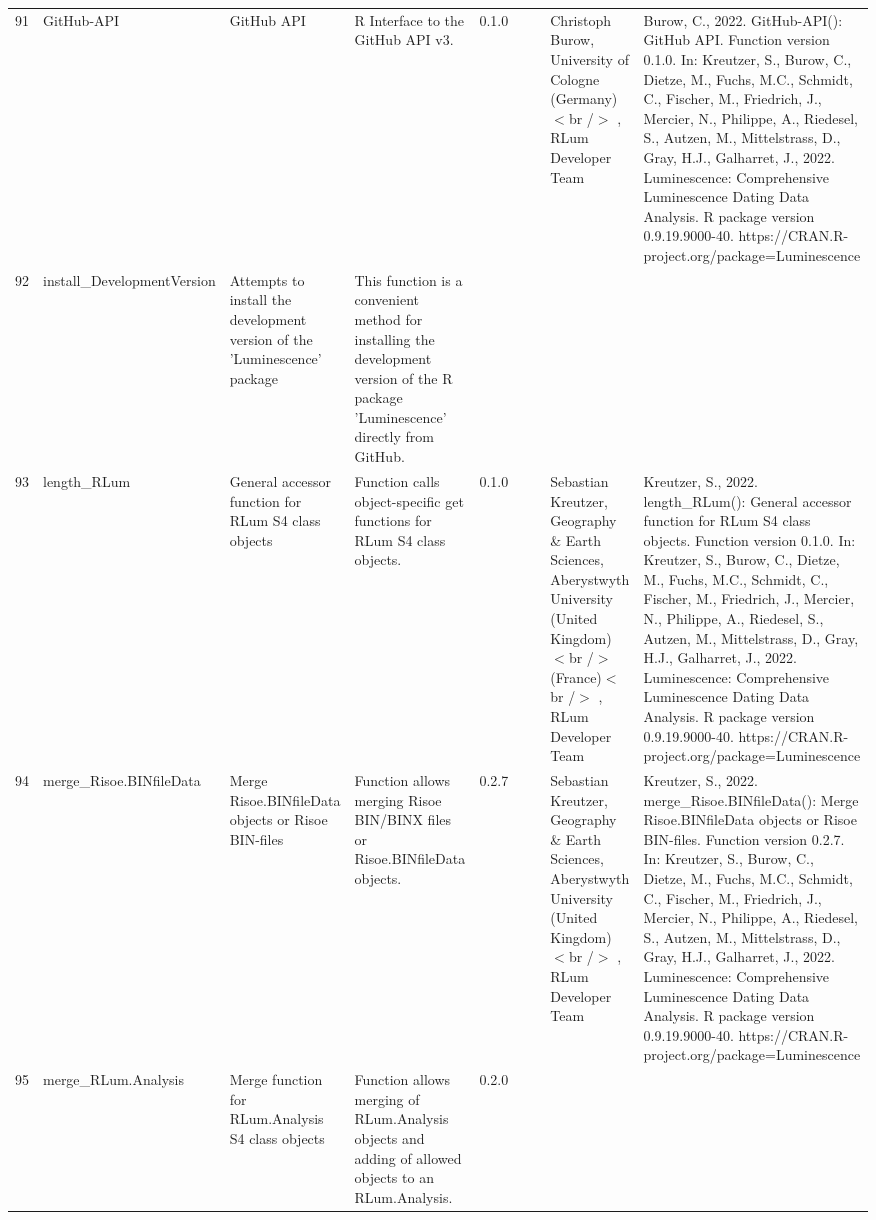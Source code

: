 \begin{table}[ht]
\begin{tabular}{rllllllll}
 \\ 
  91 & GitHub-API & GitHub API & R Interface to the GitHub API v3. & 0.1.0
 &  &  & Christoph Burow, University of Cologne (Germany)$<$br /$>$ , RLum Developer Team & Burow, C., 2022. GitHub-API(): GitHub API. Function version 0.1.0. In: Kreutzer, S., Burow, C., Dietze, M., Fuchs, M.C., Schmidt, C., Fischer, M., Friedrich, J., Mercier, N., Philippe, A., Riedesel, S., Autzen, M., Mittelstrass, D., Gray, H.J., Galharret, J., 2022. Luminescence: Comprehensive Luminescence Dating Data Analysis. R package version 0.9.19.9000-40. https://CRAN.R-project.org/package=Luminescence
 \\ 
  92 & install\_DevelopmentVersion & Attempts to install the development version of the 'Luminescence' package & This function is a convenient method for installing the development version of the R package 'Luminescence' directly from GitHub. &  &  &  &  &  \\ 
  93 & length\_RLum & General accessor function for RLum S4 class objects & Function calls object-specific get functions for RLum S4 class objects. & 0.1.0
 &  &  & Sebastian Kreutzer, Geography \& Earth Sciences, Aberystwyth University (United Kingdom)$<$br /$>$ (France)$<$br /$>$ , RLum Developer Team & Kreutzer, S., 2022. length\_RLum(): General accessor function for RLum S4 class objects. Function version 0.1.0. In: Kreutzer, S., Burow, C., Dietze, M., Fuchs, M.C., Schmidt, C., Fischer, M., Friedrich, J., Mercier, N., Philippe, A., Riedesel, S., Autzen, M., Mittelstrass, D., Gray, H.J., Galharret, J., 2022. Luminescence: Comprehensive Luminescence Dating Data Analysis. R package version 0.9.19.9000-40. https://CRAN.R-project.org/package=Luminescence
 \\ 
  94 & merge\_Risoe.BINfileData & Merge Risoe.BINfileData objects or Risoe BIN-files & Function allows merging Risoe BIN/BINX files or  Risoe.BINfileData  objects. & 0.2.7
 &  &  & Sebastian Kreutzer, Geography \& Earth Sciences, Aberystwyth University (United Kingdom)$<$br /$>$ , RLum Developer Team & Kreutzer, S., 2022. merge\_Risoe.BINfileData(): Merge Risoe.BINfileData objects or Risoe BIN-files. Function version 0.2.7. In: Kreutzer, S., Burow, C., Dietze, M., Fuchs, M.C., Schmidt, C., Fischer, M., Friedrich, J., Mercier, N., Philippe, A., Riedesel, S., Autzen, M., Mittelstrass, D., Gray, H.J., Galharret, J., 2022. Luminescence: Comprehensive Luminescence Dating Data Analysis. R package version 0.9.19.9000-40. https://CRAN.R-project.org/package=Luminescence
 \\ 
  95 & merge\_RLum.Analysis & Merge function for RLum.Analysis S4 class objects & Function allows merging of RLum.Analysis objects and adding of allowed objects to an RLum.Analysis. & 0.2.0

\end{tabular}
\end{table}
